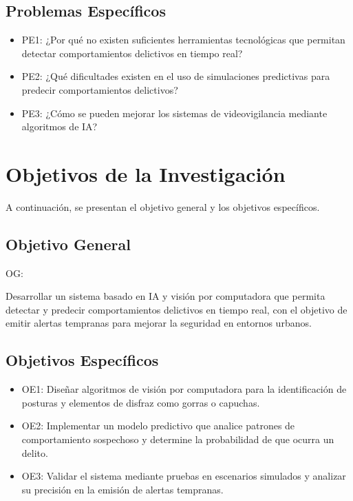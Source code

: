 \subsection{Problemas Específicos}
\newcommand{\Pbone}{
¿Por qué no existen suficientes herramientas tecnológicas que permitan detectar comportamientos delictivos en tiempo real?
}
\newcommand{\Pbtwo}{
¿Qué dificultades existen en el uso de simulaciones predictivas para predecir comportamientos delictivos?
}
\newcommand{\Pbthree}{
¿Cómo se pueden mejorar los sistemas de videovigilancia mediante algoritmos de IA?
}


\begin{itemize}
	\item PE1: {\Pbone}
	\item PE2: {\Pbtwo}
	\item PE3: {\Pbthree}
\end{itemize}

\section{Objetivos de la Investigación}
A continuación, se presentan el objetivo general y los objetivos específicos.
\subsection{Objetivo General}
OG: \newcommand{\ObjetivoGeneral}{
Desarrollar un sistema basado en IA y visión por computadora que permita detectar y predecir comportamientos delictivos en tiempo real, con el objetivo de emitir alertas tempranas para mejorar la seguridad en entornos urbanos.
}
\ObjetivoGeneral
\subsection{Objetivos Específicos}
\newcommand{\Objone}{
Diseñar algoritmos de visión por computadora para la identificación de posturas y elementos de disfraz como gorras o capuchas.
}
\newcommand{\Objtwo}{
Implementar un modelo predictivo que analice patrones de comportamiento sospechoso y determine la probabilidad de que ocurra un delito.
}
\newcommand{\Objthree}{
Validar el sistema mediante pruebas en escenarios simulados y analizar su precisión en la emisión de alertas tempranas.
}

\begin{itemize}
	\item OE1: {\Objone}
	\item OE2: {\Objtwo}
	\item OE3: {\Objthree}
\end{itemize}

